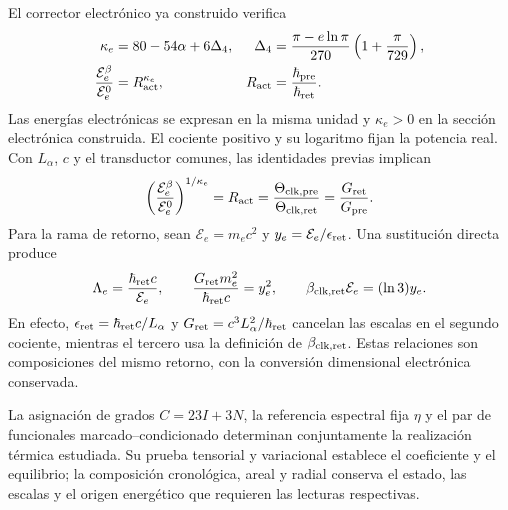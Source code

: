 El corrector electrónico ya construido verifica
\begin{align}
 \kappa_e&=80-54\alpha+6\Delta_4,&
 \Delta_4&=\frac{\pi-e\ln\pi}{270}
                 \left(1+\frac\pi{729}\right),\nonumber\\
 \frac{\mathcal E_e^{\beta}}{\mathcal E_e^0}
 &=R_{\rm act}^{\kappa_e},&
 R_{\rm act}&=\frac{\hbar_{\rm pre}}{\hbar_{\rm ret}}.
 \label{eq:ii-ter27-electron-return}
\end{align}
Las energías electrónicas se expresan en la misma unidad y
$\kappa_e>0$ en la sección electrónica construida. El cociente
positivo y su logaritmo fijan la potencia real. Con $L_\alpha$, $c$ y
el transductor comunes, las identidades previas implican
\begin{equation}
 \left(\frac{\mathcal E_e^{\beta}}{\mathcal E_e^0}\right)^{1/\kappa_e}
 =R_{\rm act}
 =\frac{\Theta_{{\rm clk,pre}}}{\Theta_{{\rm clk,ret}}}
 =\frac{G_{\rm ret}}{G_{\rm pre}}.
 \label{eq:ii-ter27-return-ratios}
\end{equation}
Para la rama de retorno, sean $\mathcal E_e=m_ec^2$ y
$y_e=\mathcal E_e/\epsilon_{\rm ret}$. Una sustitución directa produce
\begin{equation}
 \Lambda_e=\frac{\hbar_{\rm ret}c}{\mathcal E_e},\qquad
 \frac{G_{\rm ret}m_e^2}{\hbar_{\rm ret}c}=y_e^2,\qquad
 \beta_{{\rm clk,ret}}\mathcal E_e=(\ln3)y_e.
 \label{eq:ii-ter27-electron-gravity}
\end{equation}
En efecto, $\epsilon_{\rm ret}=\hbar_{\rm ret}c/L_\alpha$ y
$G_{\rm ret}=c^3L_\alpha^2/\hbar_{\rm ret}$ cancelan las escalas
en el segundo cociente, mientras el tercero usa la definición de
$\beta_{{\rm clk,ret}}$. Estas relaciones son composiciones del mismo
retorno, con la conversión dimensional electrónica conservada.

La asignación de grados $C=23I+3N$, la referencia espectral fija $\eta$
y el par de funcionales marcado--condicionado determinan conjuntamente
la realización térmica estudiada. Su prueba tensorial y variacional
establece el coeficiente y el equilibrio; la composición cronológica,
areal y radial conserva el estado, las escalas y el origen energético
que requieren las lecturas respectivas.

